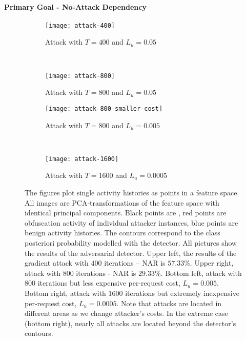 \paragraph{Primary Goal - No-Attack Dependency}

\begin{figure}[p]
    \centering

        \begin{subfigure}[b]{0.45\textwidth}
            \texttt{[image: attack-400]}
            \caption{Attack with $T = 400$ and $L_u = 0.05$}\label{fig:attack-400}
        \end{subfigure}
        ~
        \begin{subfigure}[b]{0.45\textwidth}
            \texttt{[image: attack-800]}
            \caption{Attack with $T = 800$ and $L_u = 0.05$}\label{fig:attack-800}
        \end{subfigure}

        \begin{subfigure}[b]{0.45\textwidth}
            \texttt{[image: attack-800-smaller-cost]}
            \caption{Attack with $T = 800$ and $L_u = 0.005$}\label{fig:attack-800-smaller-cost}
        \end{subfigure}
        ~
        \begin{subfigure}[b]{0.45\textwidth}
            \texttt{[image: attack-1600]}
            \caption{Attack with $T = 1600$ and $L_u = 0.0005$}\label{fig:attack-1600}
        \end{subfigure}

    \caption{The figures plot single activity histories as points in a feature space. All images are PCA-transformations of the feature space with identical principal components. Black points are \NA, red points are obfuscation activity of individual attacker instances, blue points are benign activity histories. The contours correspond to the class posteriori probability modelled with the detector. All pictures show the results of the adversarial detector. Upper left, the results of the gradient attack with $400$ iterations – NAR is $57.33\%$. Upper right, attack with $800$ iterations - NAR is $29.33\%$. Bottom left, attack with $800$ iterations but less expensive per-request cost, $L_u = 0.005$. Bottom right, attack with $1600$ iterations but extremely inexpensive per-request cost, $L_u = 0.0005$. Note that attacks are located in different areas as we change attacker's costs. In the extreme case (bottom right), nearly all attacks are located beyond the detector's contours.}\label{fig:attack-iterations}
\end{figure}

